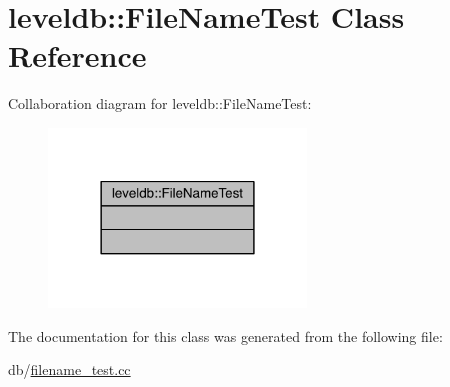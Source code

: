 \hypertarget{classleveldb_1_1_file_name_test}{}\section{leveldb\+:\+:File\+Name\+Test Class Reference}
\label{classleveldb_1_1_file_name_test}


Collaboration diagram for leveldb\+:\+:File\+Name\+Test\+:\nopagebreak
\begin{figure}[H]
\begin{center}
\leavevmode
\includegraphics[width=194pt]{classleveldb_1_1_file_name_test__coll__graph}
\end{center}
\end{figure}


The documentation for this class was generated from the following file\+:\begin{DoxyCompactItemize}
\item 
db/\hyperlink{filename__test_8cc}{filename\+\_\+test.\+cc}\end{DoxyCompactItemize}
